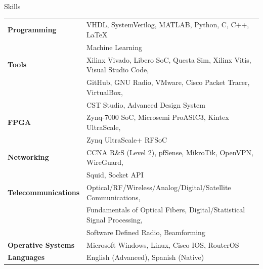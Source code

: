 \documentclass{resume} %
\begin{document}
\begin{rSection}{Skills}

    \begin{tabular}{ @{} >{\bfseries}l @{\hspace{6ex}} l }
        Programming        & VHDL, SystemVerilog, MATLAB, Python, C, C++, \LaTeX                      \\
                           & Machine Learning                                                         \\
        Tools              & Xilinx Vivado, Libero SoC, Questa Sim, Xilinx Vitis, Visual Studio Code, \\
                           & GitHub, GNU Radio, VMware, Cisco Packet Tracer, VirtualBox,              \\
                           & CST Studio, Advanced Design System                                       \\
        FPGA               & Zynq-7000 SoC, Microsemi ProASIC3, Kintex UltraScale,                    \\
                           & Zynq UltraScale+ RFSoC                                                   \\
        Networking         & CCNA R\&S (Level 2), pfSense, MikroTik, OpenVPN, WireGuard,              \\
                           & Squid, Socket API                                                        \\
        Telecommunications & Optical/RF/Wireless/Analog/Digital/Satellite Communications,             \\
                           & Fundamentals of Optical Fibers, Digital/Statistical Signal Processing,   \\
                           & Software Defined Radio, Beamforming                                      \\
        Operative Systems  & Microsoft Windows, Linux, Cisco IOS, RouterOS                            \\
        Languages          & English (Advanced), Spanish (Native)
    \end{tabular}

\end{rSection}

\clearpage
\end{document}
